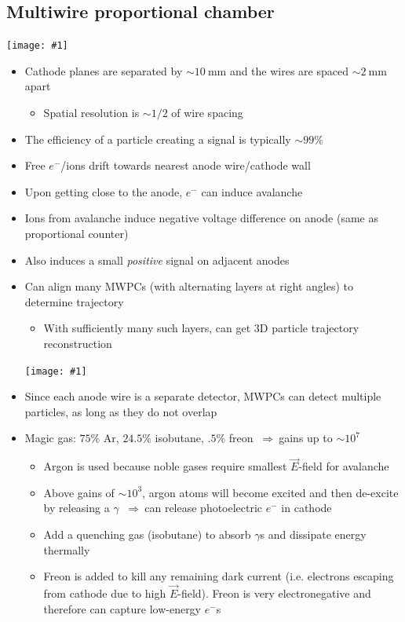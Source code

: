 \documentclass[11pt]{article}
\newcommand{\E}{\ensuremath{\vec{E}}}
\newcommand{\mm}{\text{mm}}
\newcommand{\el}{\ensuremath{e^{-}}\xspace}
\newcommand{\thus}{$~\Rightarrow~$}
\newcommand{\embedimgw}[2]{\begin{center}\texttt{[image: \#1]}\end{center}}
\begin{document}
\subsection{Multiwire proportional chamber}
\embedimgw{figs/mwpc_config.png}{.8}
\begin{itemize}
  \item Cathode planes are separated by $\sim 10~\mm$ and the wires are spaced $\sim 2~\mm$ apart
  \begin{itemize}
    \item Spatial resolution is $\sim 1/2$ of wire spacing
  \end{itemize}
  \item The efficiency of a particle creating a signal is typically $\sim 99\%$
  \item Free $\el$/ions drift towards nearest anode wire/cathode wall
  \item Upon getting close to the anode, $\el$ can induce avalanche
  \item Ions from avalanche induce negative voltage difference on anode (same as proportional counter)
  \item Also induces a small \emph{positive} signal on adjacent anodes
  \item Can align many MWPCs (with alternating layers at right angles) to determine trajectory
  \begin{itemize}
    \item With sufficiently many such layers, can get 3D particle trajectory reconstruction
  \end{itemize}
  \embedimgw{figs/mwpc_xy.png}{.8}
  \item Since each anode wire is a separate detector, MWPCs can detect multiple particles, as long as they do not overlap
  \item Magic gas: $75\%$ Ar, $24.5\%$ isobutane, $.5\%$ freon \thus gains up to $\sim 10^7$
  \begin{itemize}
    \item Argon is used because noble gases require smallest $\E$-field for avalanche
    \item Above gains of $\sim10^3$, argon atoms will become excited and then de-excite by releasing a $\gamma$ \thus can release photoelectric $\el$ in cathode
    \item Add a quenching gas (isobutane) to absorb $\gamma$s and dissipate energy thermally
    \item Freon is added to kill any remaining dark current (i.e. electrons escaping from cathode due to high $\E$-field). Freon is very electronegative and therefore can capture low-energy $\el$s

\end{itemize}
\end{itemize}
\end{document}

